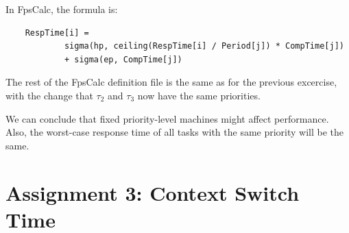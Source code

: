 \documentclass[a4paper,10pt]{article}
\begin{document}
\begin{enumerate}
	In FpsCalc, the formula is:
	
	\begin{lstlisting}
	RespTime[i] =
			sigma(hp, ceiling(RespTime[i] / Period[j]) * CompTime[j])
			+ sigma(ep, CompTime[j])
	\end{lstlisting}

        The rest of the FpsCalc definition file is the same as for the previous excercise, with the change that $\tau_2$ and $\tau_3$ now have the same priorities.
	
	We can conclude that fixed priority-level machines might affect performance. Also, the worst-case response time of all tasks with the same priority will be the same.
	
\end{enumerate}

\section{Assignment 3: Context Switch Time}
\end{document}
